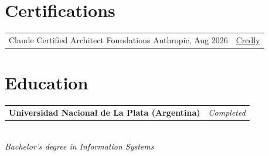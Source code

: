 \documentclass[10pt,a4paper]{article}
\makeatletter
\newcommand{\tworow}[2]{\noindent\begin{tabularx}{\textwidth}{@{}X r@{}}#1 & #2\\\end{tabularx}}
\makeatother
\begin{document}
\section*{Certifications}
\tworow{Claude Certified Architect \textendash{} Foundations \textemdash{} Anthropic, Aug 2026}{\href{https://www.credly.com/badges/f190e0f0-f216-4c74-8170-70a9c0644fec}{Credly}}

\section*{Education}
\tworow{\textbf{Universidad Nacional de La Plata (Argentina)}}{\textit{Completed}}\\[-0.2em]
\textit{Bachelor's degree in Information Systems}
\end{document}
